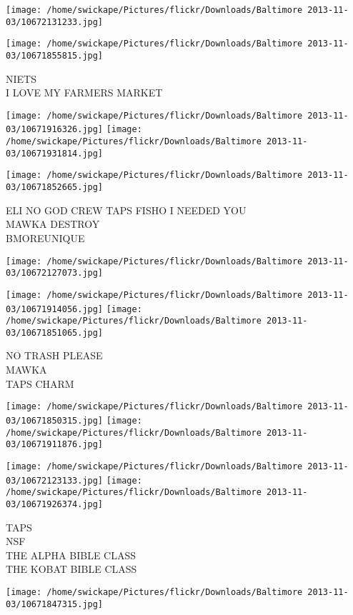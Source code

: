 \documentclass[10pt,letterpaper]{article}
\begin{document}
\texttt{[image: /home/swickape/Pictures/flickr/Downloads/Baltimore 2013-11-03/10672131233.jpg]}

\vspace{0.25in}
\texttt{[image: /home/swickape/Pictures/flickr/Downloads/Baltimore 2013-11-03/10671855815.jpg]}

NIETS\\
I LOVE MY FARMERS MARKET
\pagebreak

\texttt{[image: /home/swickape/Pictures/flickr/Downloads/Baltimore 2013-11-03/10671916326.jpg]}
\texttt{[image: /home/swickape/Pictures/flickr/Downloads/Baltimore 2013-11-03/10671931814.jpg]}

\texttt{[image: /home/swickape/Pictures/flickr/Downloads/Baltimore 2013-11-03/10671852665.jpg]}

ELI NO GOD CREW TAPS FISHO I NEEDED YOU\\
MAWKA DESTROY\\
BMOREUNIQUE
\pagebreak

\texttt{[image: /home/swickape/Pictures/flickr/Downloads/Baltimore 2013-11-03/10672127073.jpg]}

\vspace{0.25in}
\texttt{[image: /home/swickape/Pictures/flickr/Downloads/Baltimore 2013-11-03/10671914056.jpg]}
\texttt{[image: /home/swickape/Pictures/flickr/Downloads/Baltimore 2013-11-03/10671851065.jpg]}

NO TRASH PLEASE\\
MAWKA\\
TAPS CHARM
\pagebreak

\texttt{[image: /home/swickape/Pictures/flickr/Downloads/Baltimore 2013-11-03/10671850315.jpg]}
\texttt{[image: /home/swickape/Pictures/flickr/Downloads/Baltimore 2013-11-03/10671911876.jpg]}

\texttt{[image: /home/swickape/Pictures/flickr/Downloads/Baltimore 2013-11-03/10672123133.jpg]}
\texttt{[image: /home/swickape/Pictures/flickr/Downloads/Baltimore 2013-11-03/10671926374.jpg]}

TAPS\\
NSF\\
THE ALPHA BIBLE CLASS\\
THE KOBAT BIBLE CLASS
\pagebreak

\texttt{[image: /home/swickape/Pictures/flickr/Downloads/Baltimore 2013-11-03/10671847315.jpg]}
\end{document}
